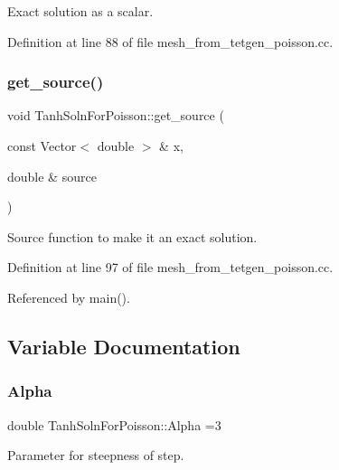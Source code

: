 Exact solution as a scalar. 



Definition at line 88 of file mesh\+\_\+from\+\_\+tetgen\+\_\+poisson.\+cc.

\mbox{\label{namespaceTanhSolnForPoisson_ae1b9d6789ff301e3d63a4e292213036c}} 
\subsubsection{\texorpdfstring{get\+\_\+source()}{get\_source()}}
{\footnotesize\ttfamily void Tanh\+Soln\+For\+Poisson\+::get\+\_\+source (\begin{DoxyParamCaption}\item[{const Vector$<$ double $>$ \&}]{x,  }\item[{double \&}]{source }\end{DoxyParamCaption})}



Source function to make it an exact solution. 



Definition at line 97 of file mesh\+\_\+from\+\_\+tetgen\+\_\+poisson.\+cc.



Referenced by main().



\subsection{Variable Documentation}
\mbox{\label{namespaceTanhSolnForPoisson_ae676ccd186d5df119cce811596d949c1}} 
\subsubsection{\texorpdfstring{Alpha}{Alpha}}
{\footnotesize\ttfamily double Tanh\+Soln\+For\+Poisson\+::\+Alpha =3}



Parameter for steepness of step. 



